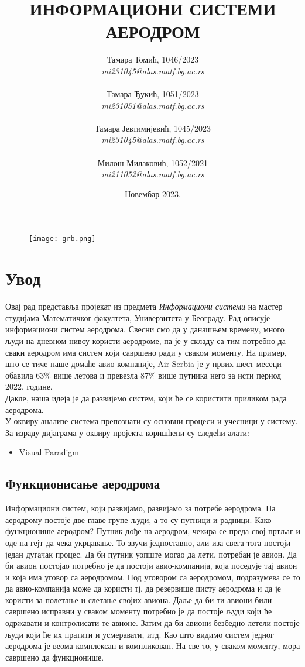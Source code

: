 \documentclass{article}
\title{\textbf{ИНФОРМАЦИОНИ СИСТЕМИ} \\
\vspace{10}
\Large{\textbf{АЕРОДРОМ}}}
\author{Тамара Томић, 1046/2023 \\ \textit{mi231045@alas.matf.bg.ac.rs} \\\\
        Тамара Ђукић, 1051/2023 \\ \textit{mi231051@alas.matf.bg.ac.rs} \\\\
        Тамара Јевтимијевић, 1045/2023 \\ \textit{mi231045@alas.matf.bg.ac.rs} \\\\
        Милош Милаковић, 1052/2021 \\ \textit{mi211052@alas.matf.bg.ac.rs}}
\date{Новембар 2023.}
\begin{document}
\maketitle

\vspace{17}
\begin{figure}[h!]
    \centering
    \texttt{[image: grb.png]}
\end{figure} 

\newpage
\tableofcontents

\newpage

\section{Увод}
Овај рад представља пројекат из предмета \textit{Информациони системи} на мастер студијама Математичког факултета, Универзитета у Београду. Рад описује информациони систем аеродрома. 
 Свесни смо да у данашњем времену, много људи на дневном нивоу користи аеродроме, па је у складу са тим потребно да сваки аеродром има систем који савршено ради у сваком моменту. На пример, што се тиче наше домаће авио-компаније, Air Serbia је у првих шест месеци обавила 63\% више летова и превезла 87\% више путника него за исти период 2022. године. \cite{bbc_srbija} \\ 
 Дакле, наша идеја је да развијемо систем, који ће се користити приликом рада аеродрома.\\
У оквиру анализе система препознати су основни процеси и учесници у систему. За израду дијаграма у оквиру пројекта коришћени су следећи алати:
\begin{itemize}
    \item Visual Paradigm
\end{itemize}

\subsection{Функционисање аеродрома}
Информациони систем, који развијамо, развијамо за потребе аеродрома. На аеродрому постоје две главе групе људи, а то су путници и радници. Како функционише аеродром? Путник дође на аеродром, чекира се преда свој пртљаг и оде на гејт да чека укрцавање. То звучи једноставно, али иза свега тога постоји један дугачак процес. Да би путник уопште могао да лети, потребан је авион. Да би авион постојао потребно је да постоји авио-компанија, која поседује тај авион и која има уговор са аеродромом. Под уговором са аеродромом, подразумева се то да авио-компанија може да користи тј. да резервише писту аеродрома и да је користи за полетање и слетање својих авиона. Даље да би ти авиони били савршено исправни у сваком моменту потребно је да постоје људи који ће одржавати и контролисати те авионе. Затим да би авиони безбедно летели постоје људи који ће их пратити и усмеравати, итд. Као што видимо систем једног аеродрома је веома комплексан и компликован. На све то, у сваком моменту, мора савршено да функционише.
\end{document}
